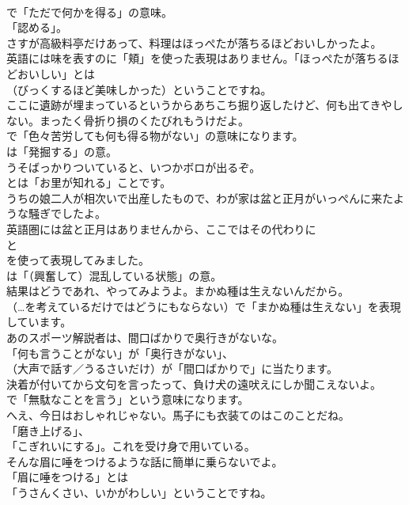 \documentclass[8pt]{extreport}
\begin{document}
\begin{CJK}{UTF8}{min}
\\	で「ただで何かを得る」の意味。
\\	「認める」。	
\\	さすが高級料亭だけあって、料理はほっぺたが落ちるほどおいしかったよ。 
\\	英語には味を表すのに「頬」を使った表現はありません。「ほっぺたが落ちるほどおいしい」とは
\\	（びっくするほど美味しかった）ということですね。	
\\	ここに遺跡が埋まっているというからあちこち掘り返したけど、何も出てきやしない。まったく骨折り損のくたびれもうけだよ。 
\\	で「色々苦労しても何も得る物がない」の意味になります。
\\	は「発掘する」の意。	
\\	うそばっかりついていると、いつかボロが出るぞ。 
\\	とは「お里が知れる」ことです。	
\\	うちの娘二人が相次いで出産したもので、わが家は盆と正月がいっぺんに来たような騒ぎでしたよ。 
\\	英語圏には盆と正月はありませんから、ここではその代わりに
\\	と
\\	を使って表現してみました。
\\	は「（興奮して）混乱している状態」の意。	
\\	結果はどうであれ、やってみようよ。まかぬ種は生えないんだから。 
\\	（…を考えているだけではどうにもならない）で「まかぬ種は生えない」を表現しています。	
\\	あのスポーツ解説者は、間口ばかりで奥行きがないな。 
\\	「何も言うことがない」が「奥行きがない」、
\\	（大声で話す／うるさいだけ）が「間口ばかりで」に当たります。	
\\	決着が付いてから文句を言ったって、負け犬の遠吠えにしか聞こえないよ。 
\\	で「無駄なことを言う」という意味になります。	
\\	へえ、今日はおしゃれじゃない。馬子にも衣装てのはこのことだね。 
\\	「磨き上げる」、
\\	「こぎれいにする」。これを受け身で用いている。	
\\	そんな眉に唾をつけるような話に簡単に乗らないでよ。 
\\	「眉に唾をつける」とは
\\	「うさんくさい、いかがわしい」ということですね。	

\end{CJK}
\end{document}

